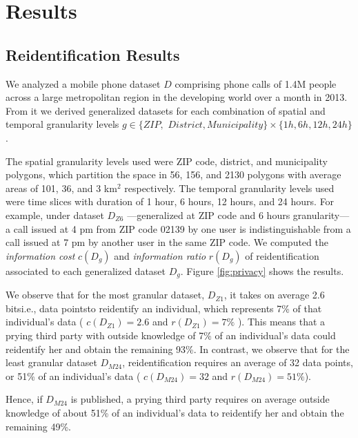 \documentclass[12pt]{article}
\begin{document}
\section{Results}
\vspace{8pt}

\subsection{\textbf{Reidentification Results}}
\vspace{8pt}

We analyzed a mobile phone dataset $D$ comprising phone calls of 1.4M people across a large metropolitan region in the developing world over a month in 2013. From it we derived generalized datasets for each combination of spatial and temporal granularity levels $g \in \{ ZIP,$ $District, Municipality\} \times \{ 1h, 6h, 12h, 24h \}$.

The spatial granularity levels used were ZIP code, district, and municipality  polygons, which partition the space in 56, 156, and 2130 polygons with average areas of 101, 36, and 3 km$^2$ respectively. The temporal granularity levels used were time slices with duration of 1 hour, 6 hours, 12 hours, and 24 hours. For example, under dataset $D_{Z6}$ ---generalized at ZIP code and 6 hours granularity--- a call issued at 4 pm from ZIP code 02139 by one user is indistinguishable from a call issued at 7 pm by another user in the same ZIP code. We computed the \textit{information cost} $c(D_g)$ and \textit{information ratio} $r(D_g)$ of reidentification associated to each generalized dataset $D_g$. Figure \ref{fig:privacy} shows the results. 


We observe that for the most granular dataset, $D_{Z1}$, it takes on average 2.6 bits\textemdash i.e., data points\textemdash to reidentify an individual, which represents 7\% of that individual's data \big( $c(D_{Z1}) = 2.6$ and $r(D_{Z1} ) = 7\%$ \big). This means that a prying third party with outside knowledge of 7\% of an individual's data could reidentify her and obtain the remaining 93\%. In contrast, we observe that for the least granular dataset $D_{M24}$, reidentification requires an average of 32 data points, or 51\% of an individual's data \big( $c(D_{M24}) = 32$ and $r(D_{M24} ) = 51\%$\big).
\iffalse \footnote{Consistent with previous studies \cite{de2013unique,noriega2015balancing}, unicity at four points increased with data granularity, and ranged $u_4(D_g) \in [97\%,1.5\%]$ (see \nameref{S1_Fig})} \fi
Hence, if $D_{M24}$ is published, a prying third party requires on average outside knowledge of about 51\% of an individual's data to reidentify her and obtain the remaining 49\%.
\end{document}
